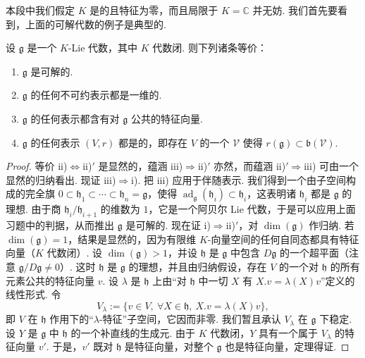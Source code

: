 \begin{numpara}[表示论刻画]\label{np:lie-2-3-3}
本段中我们假定 $K$ 是的且特征为零，而且局限于 $K=\mathbb C$ 并无妨. 我们首先要看到，上面的可解代数的例子是典型的.
\begin{theorem*}[Lie]
设 $\mathfrak g$ 是一个 $K$-Lie 代数，其中 $K$ 代数闭. 则下列诸条等价：
\begin{enumerate}[label=\roman*)]
\item $\mathfrak g$ 是可解的.
\item $\mathfrak g$ 的任何不可约表示都是一维的.
\item[$\mathrm{ii})'$] $\mathfrak g$ 的任何表示都含有对 $\mathfrak g$ 公共的特征向量.
\item $\mathfrak g$ 的任何表示 $(V,r)$ 都是的，即存在 $V$ 的一个 $\mathcal V$ 使得 $r(\mathfrak g)\subset\mathfrak b(\mathcal V)$.
\end{enumerate}
\end{theorem*}
\begin{proof}
等价 ii)$\Leftrightarrow$ii)$'$ 是显然的，蕴涵 iii)$\Rightarrow$ii)$'$ 亦然，而蕴涵 ii)$'\Rightarrow$iii) 可由一个显然的归纳看出.
现证 iii)$\Rightarrow$i). 把 iii) 应用于伴随表示. 我们得到一个由子空间构成的完全旗 $0\subset\mathfrak h_{1}\subset\cdots\subset\mathfrak h_{n}=\mathfrak g$，使得 $\operatorname{ad}_{\mathfrak g}(\mathfrak h_{i})\subset\mathfrak h_{i}$，这表明诸 $\mathfrak h_{i}$ 都是 $\mathfrak g$ 的理想. 由于商 $\mathfrak h_{i}/\mathfrak h_{i+1}$ 的维数为 $1$，它是一个阿贝尔 Lie 代数，于是可以应用上面习题中的判据，从而推出 $\mathfrak g$ 是可解的.
现在证 i)$\Rightarrow$ii)$'$，对 $\dim(\mathfrak g)$ 作归纳. 若 $\dim(\mathfrak g)=1$，结果是显然的，因为有限维 $K$-向量空间的任何自同态都具有特征向量（$K$ 代数闭）. 设 $\dim(\mathfrak g)>1$，并设 $\mathfrak h$ 是 $\mathfrak g$ 中包含 $D\mathfrak g$ 的一个超平面（注意 $\mathfrak g/D\mathfrak g\neq 0$）. 这时 $\mathfrak h$ 是 $\mathfrak g$ 的理想，并且由归纳假设，存在 $V$ 的一个对 $\mathfrak h$ 的所有元素公共的特征向量 $v$. 设 $\lambda$ 是 $\mathfrak h$ 上由``对 $\mathfrak h$ 中一切 $X$ 有 $X.v=\lambda(X)v$''定义的线性形式. 令
\[
V_{\lambda}:=\{v\in V,\ \forall X\in\mathfrak h,\ X.v=\lambda(X)v\},
\]
即 $V$ 在 $\mathfrak h$ 作用下的``$\lambda$-特征''子空间，它因而非零. 我们暂且承认 $V_{\lambda}$ 在 $\mathfrak g$ 下稳定. 设 $Y$ 是 $\mathfrak g$ 中 $\mathfrak h$ 的一个补直线的生成元. 由于 $K$ 代数闭，$Y$ 具有一个属于 $V_{\lambda}$ 的特征向量 $v'$. 于是，$v'$ 既对 $\mathfrak h$ 是特征向量，对整个 $\mathfrak g$ 也是特征向量，定理得证.

\end{proof}
\end{numpara}
